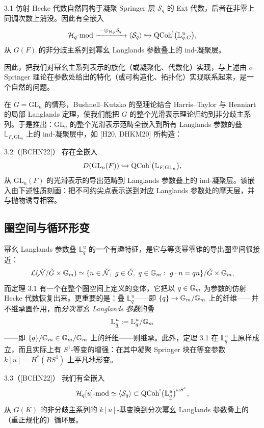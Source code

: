 \begin{thm}{3.1}\label{thm:a5-02-6}
仿射 Hecke 代数自然同构于凝聚 Springer 层 $\mathcal S_q$ 的 Ext 代数，后者在非零上同调次数上消没。因此有全嵌入
\[
\mathcal H_q\text{-}\mathrm{mod}\xrightarrow{\ -\otimes_{\mathcal H_q}\mathcal S_q\ }\langle\mathcal S_q\rangle\xhookrightarrow{\ }\QCoh^{!}\bigl(\mathbb L^u_{q,G}\bigr),
\]
从 $G(F)$ 的非分歧主系列到幂幺 Langlands 参数叠上的 ind-凝聚层。
\end{thm}

因此，把我们对幂幺主系列表示的族化（或凝聚化、代数化）实现，与上述由 $\sigma$-Springer 理论在参数处给出的特化（或可构造化、拓扑化）实现联系起来，是一个自然的问题。

在 $G=\mathrm{GL}_n$ 的情形，Bushnell–Kutzko 的型理论结合 Harris–Taylor 与 Henniart 的局部 Langlands 定理，使我们能把 $G$ 的整个光滑表示理论归约到非分歧主系列。于是推出：$\mathrm{GL}_n$ 的整个光滑表示范畴全嵌入到所有 Langlands 参数的叠 $\mathbb L_{F,\mathrm{GL}_n}$ 上的 ind-凝聚层中，如 [H20, DHKM20] 所构造：

\begin{thm}{3.2（[BCHN22]）}\label{thm:a5-02-7}
存在全嵌入
\[
D(\mathrm{GL}_n(F))\xhookrightarrow{\ }\QCoh^{!}\bigl(\mathbb L_{F,\mathrm{GL}_n}\bigr),
\]
从 $\mathrm{GL}_n(F)$ 的光滑表示的导出范畴到 Langlands 参数叠上的 ind-凝聚层。该嵌入由下述性质刻画：把不可约尖点表示送到对应 Langlands 参数处的摩天层，并与抛物诱导相容。
\end{thm}

\subsection{圈空间与循环形变}
幂幺 Langlands 参数叠 $\mathbb L^u_q$ 的一个有趣特征，是它与等变幂零锥的导出圈空间很接近：
\[
\mathcal{L}(\check{\mathcal{N}}/\check G\times\mathbb{G}_m)\simeq\{n\in\check{\mathcal{N}},\ g\in\check G,\ q\in\mathbb{G}_m:\ g\cdot n=qn\}/\check G\times\mathbb{G}_m,
\]
而定理 3.1 有一个在整个圈空间上定义的变体，它把以 $q\in\mathbb{G}_m$ 为参数的仿射 Hecke 代数恢复出来。更重要的是：叠 $\mathbb L^u_q$——即 $\{q\}\to\mathbb{G}_m/\mathbb{G}_m$ 上的纤维——并不继承圆作用，而\emph{分次幂幺 Langlands 参数}的叠
\[
\mathbb L^u_{\underline q}:=\mathbb L^u_q/\mathbb{G}_m
\]
——即 $\{q\}/\mathbb{G}_m\in\mathbb{G}_m/\mathbb{G}_m$ 上的纤维——则继承。此外，定理 3.1 在 $\mathbb L^u_{\underline q}$ 上原样成立，而且实际上有 $S^1$-等变的增强：在其中凝聚 Springer 块在等变参数 $k[u]=H^*(BS^1)$ 上平凡地形变。

\begin{thm}{3.3（[BCHN22]）}\label{thm:a5-02-8}
我们有全嵌入
\[
\mathcal H_q[u]\text{-}\mathrm{mod}\simeq\langle\mathcal S_q\rangle\subset\operatorname{QCoh}^{!}\bigl(\mathbb L^u_{\underline q}\bigr)^{\omega S^1},
\]
从 $G(K)$ 的非分歧主系列的 $k[u]$-基变换到分次幂幺 Langlands 参数叠上的（重正规化的）循环层。
\end{thm}


